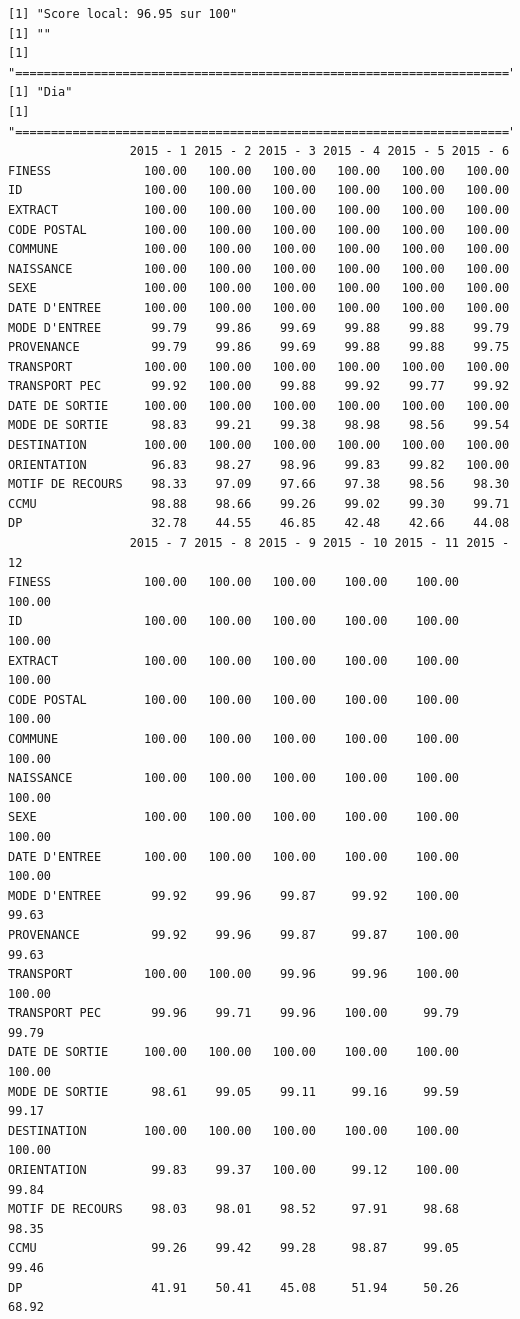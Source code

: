 \documentclass[]{article}
\begin{document}
\begin{verbatim}
[1] "Score local: 96.95 sur 100"
[1] ""
[1] "====================================================================="
[1] "Dia"
[1] "====================================================================="
                 2015 - 1 2015 - 2 2015 - 3 2015 - 4 2015 - 5 2015 - 6
FINESS             100.00   100.00   100.00   100.00   100.00   100.00
ID                 100.00   100.00   100.00   100.00   100.00   100.00
EXTRACT            100.00   100.00   100.00   100.00   100.00   100.00
CODE POSTAL        100.00   100.00   100.00   100.00   100.00   100.00
COMMUNE            100.00   100.00   100.00   100.00   100.00   100.00
NAISSANCE          100.00   100.00   100.00   100.00   100.00   100.00
SEXE               100.00   100.00   100.00   100.00   100.00   100.00
DATE D'ENTREE      100.00   100.00   100.00   100.00   100.00   100.00
MODE D'ENTREE       99.79    99.86    99.69    99.88    99.88    99.79
PROVENANCE          99.79    99.86    99.69    99.88    99.88    99.75
TRANSPORT          100.00   100.00   100.00   100.00   100.00   100.00
TRANSPORT PEC       99.92   100.00    99.88    99.92    99.77    99.92
DATE DE SORTIE     100.00   100.00   100.00   100.00   100.00   100.00
MODE DE SORTIE      98.83    99.21    99.38    98.98    98.56    99.54
DESTINATION        100.00   100.00   100.00   100.00   100.00   100.00
ORIENTATION         96.83    98.27    98.96    99.83    99.82   100.00
MOTIF DE RECOURS    98.33    97.09    97.66    97.38    98.56    98.30
CCMU                98.88    98.66    99.26    99.02    99.30    99.71
DP                  32.78    44.55    46.85    42.48    42.66    44.08
                 2015 - 7 2015 - 8 2015 - 9 2015 - 10 2015 - 11 2015 - 12
FINESS             100.00   100.00   100.00    100.00    100.00    100.00
ID                 100.00   100.00   100.00    100.00    100.00    100.00
EXTRACT            100.00   100.00   100.00    100.00    100.00    100.00
CODE POSTAL        100.00   100.00   100.00    100.00    100.00    100.00
COMMUNE            100.00   100.00   100.00    100.00    100.00    100.00
NAISSANCE          100.00   100.00   100.00    100.00    100.00    100.00
SEXE               100.00   100.00   100.00    100.00    100.00    100.00
DATE D'ENTREE      100.00   100.00   100.00    100.00    100.00    100.00
MODE D'ENTREE       99.92    99.96    99.87     99.92    100.00     99.63
PROVENANCE          99.92    99.96    99.87     99.87    100.00     99.63
TRANSPORT          100.00   100.00    99.96     99.96    100.00    100.00
TRANSPORT PEC       99.96    99.71    99.96    100.00     99.79     99.79
DATE DE SORTIE     100.00   100.00   100.00    100.00    100.00    100.00
MODE DE SORTIE      98.61    99.05    99.11     99.16     99.59     99.17
DESTINATION        100.00   100.00   100.00    100.00    100.00    100.00
ORIENTATION         99.83    99.37   100.00     99.12    100.00     99.84
MOTIF DE RECOURS    98.03    98.01    98.52     97.91     98.68     98.35
CCMU                99.26    99.42    99.28     98.87     99.05     99.46
DP                  41.91    50.41    45.08     51.94     50.26     68.92
\end{verbatim}
\end{document}
